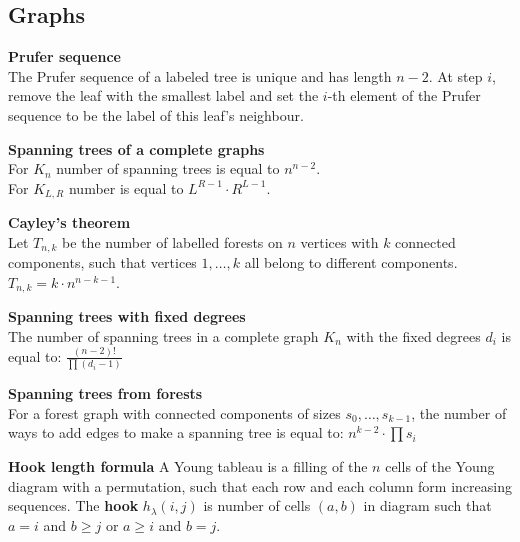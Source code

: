 \subsection{Graphs}

\textbf{Prufer sequence}\\
The Prufer sequence of a labeled tree is unique and has length $n - 2$. 
At step $i$, remove the leaf with the smallest label and set the $i$-th 
element of the Prufer sequence to be the label of this leaf's neighbour.

\textbf{Spanning trees of a complete graphs}\\
For $K_n$ number of spanning trees is equal to $n^{n - 2}$.\\
For $K_{L, R}$ number is equal to $L^{R - 1} \cdot R^{L - 1}$.

\textbf{Cayley's theorem}\\
Let $T_{n, k}$ be the number of labelled forests on $n$ vertices with $k$ connected components, 
such that vertices $1, \dots, k$ all belong to different components. 
$T_{n,k} = k \cdot n^{n - k - 1}$.

\textbf{Spanning trees with fixed degrees}\\
The number of spanning trees in a complete graph $K_{n}$ with the fixed degrees
$d_{i}$ is equal to:
$ \frac{(n - 2)!}{\prod(d_i - 1)} $

\textbf{Spanning trees from forests}\\
For a forest graph with connected components of sizes $s_0, \dots, s_{k - 1}$, 
the number of ways to add edges to make a spanning tree is equal to:
$ n^{k - 2} \cdot \prod s_i$

\textbf{Hook length formula}
A Young tableau is a filling of the $n$ cells of the Young diagram with a permutation, 
such that each row and each column form increasing sequences. 
The \textbf{hook} $h_{\lambda}(i, j)$ is number of cells $(a, b)$ in diagram such that
$a = i$ and $b \ge j$ or $a \ge i$ and $b = j$.


